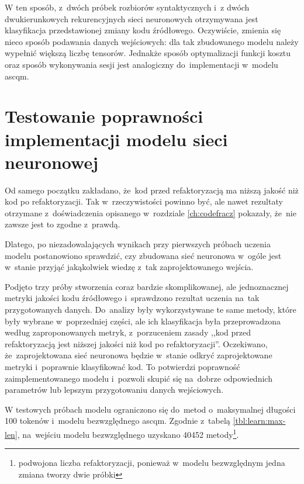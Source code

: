\documentclass[twoside]{praca}
\begin{document}
W ten sposób, z~dwóch próbek rozbiorów syntaktycznych i~z dwóch dwukierunkowych rekurencyjnych sieci neuronowych otrzymywana jest klasyfikacja przedstawionej zmiany kodu źródłowego. Oczywiście, zmienia się nieco sposób podawania danych wejściowych: dla tak zbudowanego modelu należy wypełnić większą liczbę tensorów. Jednakże sposób optymalizacji funkcji kosztu oraz sposób wykonywania sesji jest analogiczny do~implementacji w~modelu \gls{ascqm}.


\clearpage
\section{Testowanie poprawności implementacji modelu\- sieci neuronowej}
\label{apdx:testing}
\setcounter{table}{0}
\renewcommand{\thetable}{D.\arabic{table}}
\setcounter{figure}{0}
\renewcommand{\thefigure}{D.\arabic{figure}}
\setcounter{lstlisting}{0}
\renewcommand{\thelstlisting}{D.\arabic{lstlisting}}

Od samego początku zakładano, że~kod przed refaktoryzacją ma niższą jakość niż kod po refaktoryzacji. Tak w~rzeczywistości powinno być, ale nawet rezultaty otrzymane z~doświadczenia opisanego w~rozdziale \ref{ch:codefracz} pokazały, że~nie zawsze jest to zgodne z~prawdą.

Dlatego, po niezadowalających wynikach przy pierwszych próbach uczenia modelu postanowiono sprawdzić, czy zbudowana sieć neuronowa w~ogóle jest w~stanie przyjąć jakąkolwiek wiedzę z~tak zaprojektowanego wejścia.

Podjęto trzy próby stworzenia coraz bardzie skomplikowanej, ale jednoznacznej metryki jakości kodu źródłowego i~sprawdzono rezultat uczenia na~tak przygotowanych danych. Do~analizy były wykorzystywane te same metody, które były wybrane w~poprzedniej części, ale ich klasyfikacja była przeprowadzona według zaproponowanych metryk, z~porzuceniem zasady ,,kod przed refaktoryzacją jest niższej jakości niż kod po refaktoryzacji''. Oczekiwano, że~zaprojektowana sieć neuronowa będzie w~stanie odkryć zaprojektowane metryki i~poprawnie klasyfikować kod. To potwierdzi poprawność zaimplementowanego modelu i~pozwoli skupić się na~dobrze odpowiednich parametrów lub lepszym przygotowaniu danych wejściowych.

W  testowych próbach modelu ograniczono się do~metod o~maksymalnej długości 100 tokenów i~modelu bezwzględnego \gls{ascqm}. Zgodnie z~tabelą \ref{tbl:learn:max-len}, na~wejściu modelu bezwzględnego uzyskano 40452 metody\footnote{podwojona liczba refaktoryzacji, ponieważ w~modelu bezwzględnym jedna zmiana tworzy dwie próbki}.
\end{document}
